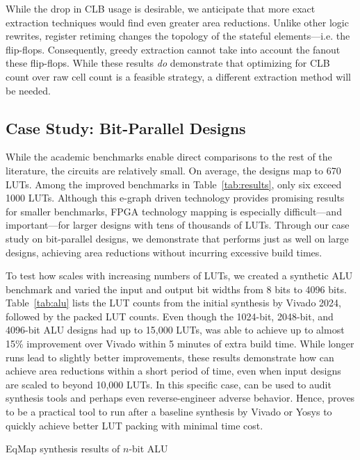 While the drop in CLB usage is desirable, we anticipate that more exact
extraction techniques would find even greater area reductions. Unlike other
logic rewrites, register retiming changes the topology of the stateful
elements---i.e. the flip-flops. Consequently, greedy extraction cannot take
into account the fanout these flip-flops. While these results \textit{do}
demonstrate that optimizing for CLB count over raw cell count is a feasible
strategy, a different extraction method will be needed.

\subsection{Case Study: Bit-Parallel Designs}\label{sec:results:scalability}

While the academic benchmarks enable direct comparisons to the rest of the
literature, the circuits are relatively small. On average, the designs map to
670 LUTs. Among the \nimproved{} improved benchmarks in
Table~\ref{tab:results}, only six exceed 1000 LUTs. Although this e-graph
driven technology provides promising results for smaller benchmarks, FPGA
technology mapping is especially difficult---and important---for larger designs
with tens of thousands of LUTs. Through our case study on bit-parallel designs,
we demonstrate that \shortname{} performs just as well on large designs,
achieving area reductions without incurring excessive build times.

To test how \shortname{} scales with increasing numbers of LUTs, we created a
synthetic ALU benchmark and varied the input and output bit widths from 8 bits
to 4096 bits. Table~\ref{tab:alu} lists the LUT counts from the initial
synthesis by Vivado 2024, followed by the packed LUT counts. Even though the
1024-bit, 2048-bit, and 4096-bit ALU designs had up to 15,000 LUTs,
\shortname{} was able to achieve up to almost 15\% improvement over Vivado
within 5 minutes of extra build time. While longer runs lead to slightly better
improvements, these results demonstrate how \shortname{} can achieve area
reductions within a short period of time, even when input designs are scaled to
beyond 10,000 LUTs. In this specific case, \shortname{} can be used to audit
synthesis tools and perhaps even reverse-engineer adverse behavior. Hence,
\shortname{} proves to be a practical tool to run after a baseline synthesis by
Vivado or Yosys to quickly achieve better LUT packing with minimal time cost.

\begin{table}
    \centering
    \caption{EqMap synthesis results of $n$-bit ALU}\label{tab:alu}
\end{table}